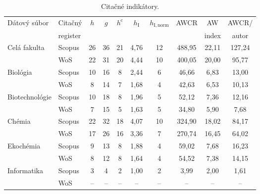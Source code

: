 \begin{table}
\centering\small
\caption{Citačné indikátory.}
\label{tab:citation.indicators}
\begin{tabular}{llcccccccc}
  \hline\noalign{\vspace{.3ex}}
  Dátový súbor & Citačný  & $h$ & $g$ & $h^{\mathrm{c}}$ & $h_{\mathrm{I}}$ & $h_{\mathrm{I, norm}}$ & AWCR & AW    & AWCR/ \\
               & register &     &     &                  &                  &                        &       & index & autor \\[0.3ex]
  \hline\noalign{\vspace{.5ex}}
  Celá fakulta   & Scopus & 26 & 36 & 21 & 4,76 & 12 & 488,95 & 22,11 & 127,24 \\
                 & WoS    & 22 & 31 & 20 & 4,44 & 10 & 400,05 & 20,00 &  95,77 \\[1ex]
  Biológia       & Scopus & 10 & 16 &  8 & 2,44 &  6 &  46,66 &  6,83 &  13,00 \\
                 & WoS    &  8 & 14 &  7 & 1,68 &  4 &  42,63 &  6,53 &  10,13 \\[1ex]
  Biotechnológie & Scopus & 10 & 18 &  8 & 1,96 &  5 &  52,12 &  7,36 &  12,16 \\
                 & WoS    &  7 & 15 &  5 & 1,63 &  5 &  34,80 &  5,90 &   7,68 \\[1ex]
  Chémia         & Scopus & 22 & 32 & 18 & 4,07 & 10 & 324,90 & 18,02 &  84,17 \\
                 & WoS    & 17 & 26 & 16 & 3,36 &  7 & 270,74 & 16,45 &  64,02 \\[1ex]
  Ekochémia      & Scopus &  9 & 13 &  8 & 1,88 &  4 &  59,02 &  7,68 &  16,23 \\
                 & WoS    &  8 & 12 &  8 & 1,64 &  4 &  54,52 &  7,38 &  14,15 \\[1ex]
  Informatika    & Scopus &  3 &  4 &  2 & 1,00 &  2 &   3,99 &  2,00 &   1,61 \\
                 & WoS    & -- & -- & -- &  --  & -- &  --    & --    &  --    \\[0.5ex]
  \hline
\end{tabular}
\end{table}

